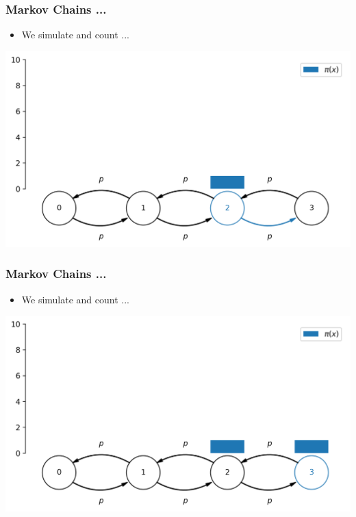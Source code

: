 \begin{frame}[c]
    \frametitle{Markov Chains ...}
    \begin{itemize}
        \item We simulate and count ...
    \end{itemize}
    \begin{center}
        \includegraphics[scale=0.6]{imgs/simulation0.png}
    \end{center}
\end{frame}

\begin{frame}[c]
    \frametitle{Markov Chains ...}
    \begin{itemize}
        \item We simulate and count ...
    \end{itemize}
    \begin{center}
        \includegraphics[scale=0.6]{imgs/simulation1.png}
    \end{center}
\end{frame}

